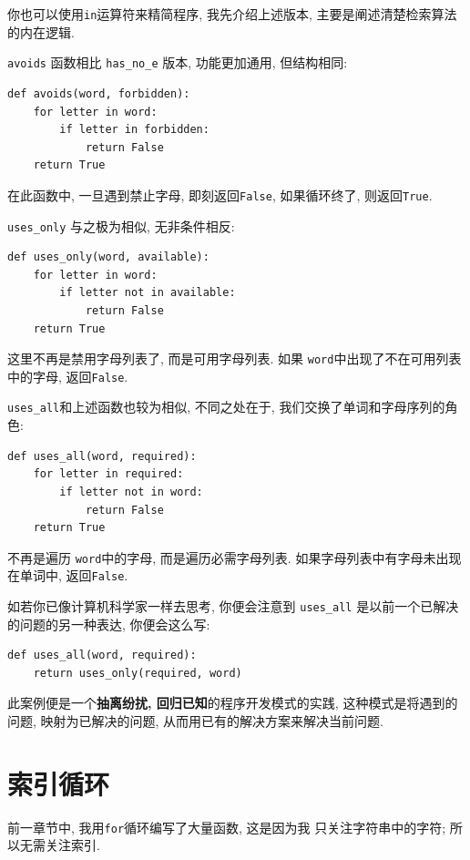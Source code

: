 \documentclass[10pt]{book}
\begin{document}
你也可以使用{\tt in}运算符来精简程序, 
我先介绍上述版本, 主要是阐述清楚检索算法的内在逻辑. 

{\tt avoids} 函数相比 \verb"has_no_e" 版本, 功能更加通用, 
但结构相同:

\begin{verbatim}
def avoids(word, forbidden):
    for letter in word:
        if letter in forbidden:
            return False
    return True
\end{verbatim}
%
在此函数中, 一旦遇到禁止字母, 即刻返回{\tt False}, 
如果循环终了, 则返回{\tt True}. 

\verb"uses_only" 与之极为相似, 无非条件相反:

\begin{verbatim}
def uses_only(word, available):
    for letter in word: 
        if letter not in available:
            return False
    return True
\end{verbatim}
%
这里不再是禁用字母列表了, 而是可用字母列表. 
如果 {\tt word}中出现了不在可用列表中的字母, 返回{\tt False}.

\verb"uses_all"和上述函数也较为相似, 不同之处在于, 
我们交换了单词和字母序列的角色:

\begin{verbatim}
def uses_all(word, required):
    for letter in required: 
        if letter not in word:
            return False
    return True
\end{verbatim}
%
不再是遍历 {\tt word}中的字母, 
而是遍历必需字母列表. 
如果字母列表中有字母未出现在单词中, 返回{\tt False}.

如若你已像计算机科学家一样去思考, 你便会注意到 \verb"uses_all" 
是以前一个已解决的问题的另一种表达, 你便会这么写:

\begin{verbatim}
def uses_all(word, required):
    return uses_only(required, word)
\end{verbatim}
%
此案例便是一个{\bf 抽离纷扰, 回归已知}的程序开发模式的实践, 
这种模式是将遇到的问题, 映射为已解决的问题, 
从而用已有的解决方案来解决当前问题.   


\section{索引循环}
前一章节中, 我用{\tt for}循环编写了大量函数, 这是因为我
只关注字符串中的字符; 所以无需关注索引. 
\end{document}
